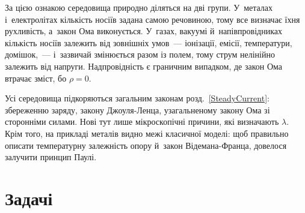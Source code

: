 За цією ознакою середовища природно діляться на дві групи. У~металах і~електролітах
кількість носіїв задана самою речовиною, тому все визначає їхня рухливість, а~закон Ома
виконується. У~газах, вакуумі й~напівпровідниках кількість носіїв залежить від зовнішніх
умов~--- іонізації, емісії, температури, домішок,~--- і~зазвичай змінюється разом із
полем, тому струм нелінійно залежить від напруги. Надпровідність є граничним випадком, де
закон Ома втрачає зміст, бо $\rho=0$.

Усі середовища підкоряються загальним законам розд.~\ref{SteadyCurrent}: збереженню
заряду, закону Джоуля-Ленца, узагальненому закону Ома зі сторонніми силами. Нові тут лише
мікроскопічні причини, які визначають $\lambda$. Крім того, на прикладі металів видно межі
класичної моделі: щоб правильно описати температурну залежність опору й~закон
Відемана-Франца, довелося залучити принцип Паулі.


\section*{Задачі}


